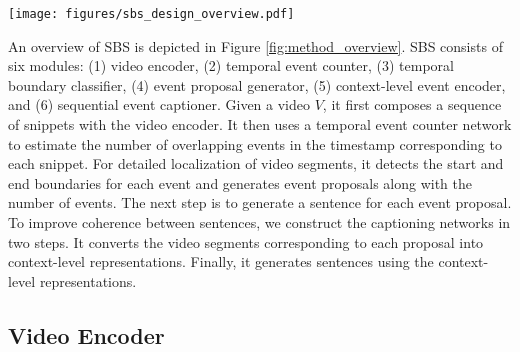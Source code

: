 \begin{figure*}[t]
  \centering
  \texttt{[image: figures/sbs\_design\_overview.pdf]}
  \caption{
    Summary of procedures in SBS.\@
    (1) Video encoder: Given a video, SBS first extracts the spatiotemporal video features using the C3D networks.
    The transformer encoder encodes the C3D features with long-range temporal dependency.
    (2) Temporal event counter: The first step for event localization is to estimate the explicit number of events by taking the encoded video as input.
    (3) Temporal boundary classifier: To accurately localize the start and end of the event, the next step is to classify the boundaries of the events in the timeline.
    (4) Event proposal generation: The algorithm generates event proposals from the acquired event count and boundaries without an event selection algorithm.
    (5) Context-level event encoder: A context-level event encoder composed of a single LSTM takes a sequence of event proposals as input and outputs the context-encoded hidden state.
    (6) Sequential event captioner: Finally, the sequential event captioner outputs each word together with the context feature.
  }
  \label{fig:method_overview}
\end{figure*}

An overview of SBS is depicted in Figure \ref{fig:method_overview}.
SBS consists of six modules: (1) video encoder, (2) temporal event counter, (3) temporal boundary classifier, (4) event proposal generator, (5) context-level event encoder, and (6) sequential event captioner.
Given a video $V$, it first composes a sequence of snippets with the video encoder.
It then uses a temporal event counter network to estimate the number of overlapping events in the timestamp corresponding to each snippet.
For detailed localization of video segments, it detects the start and end boundaries for each event and generates event proposals along with the number of events.
The next step is to generate a sentence for each event proposal.
To improve coherence between sentences, we construct the captioning networks in two steps.
It converts the video segments corresponding to each proposal into context-level representations.
Finally, it generates sentences using the context-level representations.

\subsection{Video Encoder}
\label{subsec:method_video_encoder}

